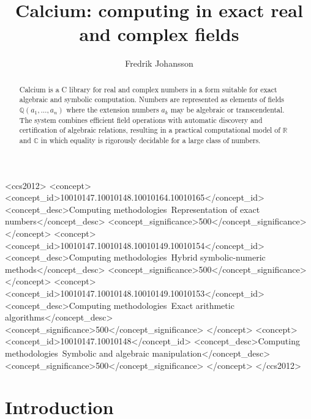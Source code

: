 \documentclass[sigconf,screen,urlbreakonhyphens]{acmart}
\title{Calcium: computing in exact real and complex fields}
\date{}
\author{Fredrik Johansson}
\affiliation{%
  \institution{Inria Bordeaux and Institut Math. Bordeaux}
  \city{33400 Talence}
  \country{France}
}
\begin{document}
\begin{abstract}
Calcium is a C library for real and complex numbers
in a form suitable for exact algebraic and symbolic computation.
Numbers are represented as elements of
fields $\mathbb{Q}(a_1,\ldots,a_n)$ where
the extension numbers
$a_k$ may be algebraic or transcendental.
The system combines efficient field operations
with automatic discovery and certification of algebraic relations,
resulting in a practical computational model of $\mathbb{R}$ and $\mathbb{C}$
in which equality is rigorously decidable for a large class of numbers.
\end{abstract}

\begin{CCSXML}
<ccs2012>
   <concept>
       <concept_id>10010147.10010148.10010164.10010165</concept_id>
       <concept_desc>Computing methodologies~Representation of exact numbers</concept_desc>
       <concept_significance>500</concept_significance>
       </concept>
   <concept>
       <concept_id>10010147.10010148.10010149.10010154</concept_id>
       <concept_desc>Computing methodologies~Hybrid symbolic-numeric methods</concept_desc>
       <concept_significance>500</concept_significance>
       </concept>
   <concept>
       <concept_id>10010147.10010148.10010149.10010153</concept_id>
       <concept_desc>Computing methodologies~Exact arithmetic algorithms</concept_desc>
       <concept_significance>500</concept_significance>
       </concept>
   <concept>
       <concept_id>10010147.10010148</concept_id>
       <concept_desc>Computing methodologies~Symbolic and algebraic manipulation</concept_desc>
       <concept_significance>500</concept_significance>
       </concept>
 </ccs2012>
\end{CCSXML}



\maketitle

\section{Introduction}
\end{document}
